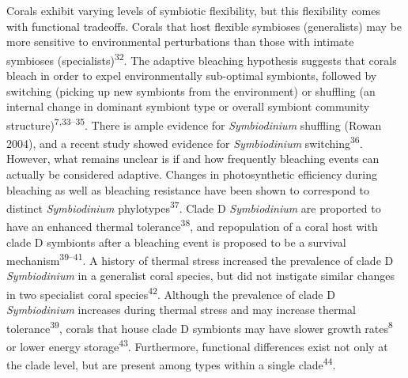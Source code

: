\documentclass[]{article}
\begin{document}
Corals exhibit varying levels of symbiotic flexibility, but this
flexibility comes with functional tradeoffs. Corals that host flexible
symbioses (generalists) may be more sensitive to environmental
perturbations than those with intimate symbioses
(specialists)\textsuperscript{32}. The adaptive bleaching hypothesis
suggests that corals bleach in order to expel environmentally
sub-optimal symbionts, followed by switching (picking up new symbionts
from the environment) or shuffling (an internal change in dominant
symbiont type or overall symbiont community
structure)\textsuperscript{7,33--35}. There is ample evidence for
\emph{Symbiodinium} shuffling (Rowan 2004), and a recent study showed
evidence for \emph{Symbiodinium} switching\textsuperscript{36}. However,
what remains unclear is if and how frequently bleaching events can
actually be considered adaptive. Changes in photosynthetic efficiency
during bleaching as well as bleaching resistance have been shown to
correspond to distinct \emph{Symbiodinium}
phylotypes\textsuperscript{37}. Clade D \emph{Symbiodinium} are
proported to have an enhanced thermal tolerance\textsuperscript{38}, and
repopulation of a coral host with clade D symbionts after a bleaching
event is proposed to be a survival mechanism\textsuperscript{39--41}. A
history of thermal stress increased the prevalence of clade D
\emph{Symbiodinium} in a generalist coral species, but did not instigate
similar changes in two specialist coral species\textsuperscript{42}.
Although the prevalence of clade D \emph{Symbiodinium} increases during
thermal stress and may increase thermal tolerance\textsuperscript{39},
corals that house clade D symbionts may have slower growth
rates\textsuperscript{8} or lower energy storage\textsuperscript{43}.
Furthermore, functional differences exist not only at the clade level,
but are present among types within a single clade\textsuperscript{44}.
\end{document}
